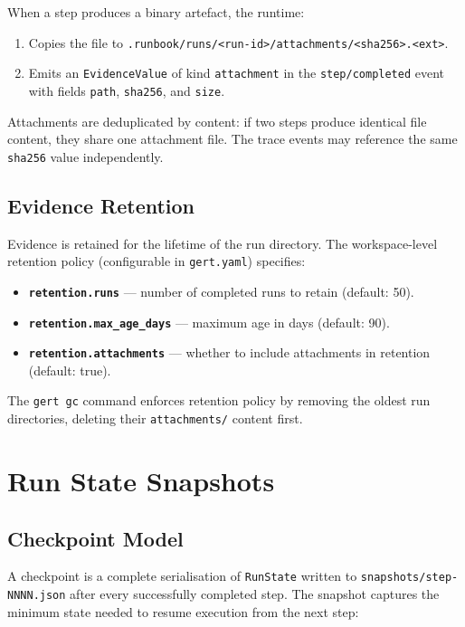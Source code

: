 When a step produces a binary artefact, the runtime:

\begin{enumerate}
  \item Copies the file to \texttt{.runbook/runs/<run-id>/attachments/<sha256>.<ext>}.
  \item Emits an \texttt{EvidenceValue} of kind \texttt{attachment} in the \texttt{step/completed} event with fields \texttt{path}, \texttt{sha256}, and \texttt{size}.
\end{enumerate}

Attachments are deduplicated by content: if two steps produce identical file content, they share one attachment file. The trace events may reference the same \texttt{sha256} value independently.

\subsection{Evidence Retention}

Evidence is retained for the lifetime of the run directory. The workspace-level retention policy (configurable in \texttt{gert.yaml}) specifies:

\begin{itemize}
  \item \textbf{\texttt{retention.runs}} — number of completed runs to retain (default: 50).
  \item \textbf{\texttt{retention.max\_age\_days}} — maximum age in days (default: 90).
  \item \textbf{\texttt{retention.attachments}} — whether to include attachments in retention (default: true).
\end{itemize}

The \texttt{gert gc} command enforces retention policy by removing the oldest run directories, deleting their \texttt{attachments/} content first.

\section{Run State Snapshots}

\subsection{Checkpoint Model}

A checkpoint is a complete serialisation of \texttt{RunState} written to \texttt{snapshots/step-NNNN.json} after every successfully completed step. The snapshot captures the minimum state needed to resume execution from the next step:

